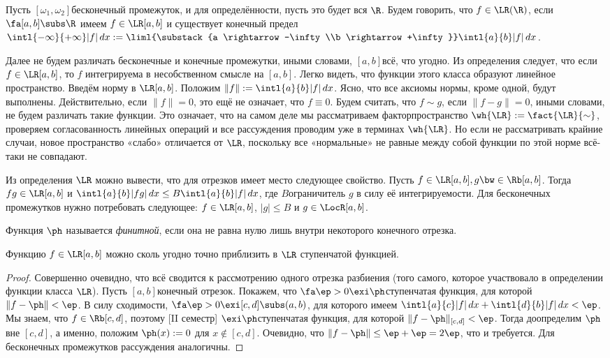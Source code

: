 \documentclass[a4paper]{article}
\newcommand{\intlab}{\intl{a}{b}}
\newcommand{\intlii}{\intl{-\infty}{+\infty}}
\begin{document}
Пусть $[\omega_1,\omega_2]$\т бесконечный промежуток, и для определённости, пусть это будет вся
$\R$. Будем говорить, что $f \in\LR(\R)$, если $\fa [a,b] \subs \R$ имеем $f \in\LR[a,b]$ и
существует конечный предел $\intlii |f|\,d x := \liml{\substack{a \rightarrow -\infty\\b
\rightarrow +\infty}}\intlab |f|\,d x$.

Далее не будем различать бесконечные и конечные промежутки, иными словами, $[a,b]$\т всё, что
угодно. Из определения следует, что если $f \in\LR[a,b]$, то $f$ интегрируема в несобственном
смысле на $[a,b]$. Легко видеть, что функции этого класса образуют линейное пространство. Введём
норму в $\LR[a,b]$. Положим $\|f\| := \intlab |f|\,d x$. Ясно, что все аксиомы нормы, кроме одной,
будут выполнены. Действительно, если $\|f\| = 0$, это ещё не означает, что $f \equiv 0$. Будем
считать, что $f\sim g$, если $\|f-g\| = 0$, иными словами, не будем различать такие функции. Это
означает, что на самом деле мы рассматриваем факторпространство $\wh{\LR} := \fact{\LR}{\sim}$,
проверяем согласованность линейных операций и все рассуждения проводим уже в терминах $\wh{\LR}$.
Но если не рассматривать крайние случаи, новое пространство «слабо» отличается от $\LR$, поскольку
все «нормальные» не равные между собой функции по этой норме всё-таки не совпадают.

Из определения $\LR$ можно вывести, что для отрезков имеет место следующее свойство. Пусть $f
\in\LR[a,b], g\bw\in\Rb[a,b]$. Тогда $fg \in\LR[a,b]$ и $\intlab |fg|\,d x \le B\intlab |f|\,d x$,
где $B$\т ограничитель $g$ в силу её интегрируемости. Для бесконечных промежутков нужно
потребовать следующее: $f \in\LR[a,b]$, $|g| \le B$ и $g \in\LocR[a,b]$.

\begin{df}
Функция $\ph$ называется \emph{финитной}, если она не равна нулю лишь внутри некоторого конечного отрезка.
\end{df}

\begin{theorem}
Функцию $f \in\LR[a,b]$ можно сколь угодно точно приблизить в $\LR$ ступенчатой функцией.
\end{theorem}
\begin{proof}
Совершенно очевидно, что всё сводится к рассмотрению одного отрезка разбиения (того самого, которое
участвовало в определении функции класса $\LR$). Пусть $[a,b]$\т конечный отрезок. Покажем, что
$\fa \ep > 0 \exi \ph$\т ступенчатая функция, для которой $\|f - \ph\| < \ep$. В силу сходимости,
$\fa \ep > 0 \exi [c,d] \subs (a,b)$, для которого имеем $\intl{a}{c}|f|\,d x + \intl{d}{b}|f|\,d
x < \ep$. Мы знаем, что $f \in\Rb[c,d]$, поэтому [II семестр] $\exi \ph$\т ступенчатая функция,
для которой $\|f - \ph\|_{[c,d]} < \ep$. Тогда доопределим $\ph$ вне $[c,d]$, а именно, положим
$\ph(x) := 0$ для $x \notin [c,d]$. Очевидно, что $\|f - \ph\| \le \ep + \ep = 2\ep$, что и
требуется. Для бесконечных промежутков рассуждения аналогичны.
\end{proof}
\end{document}
